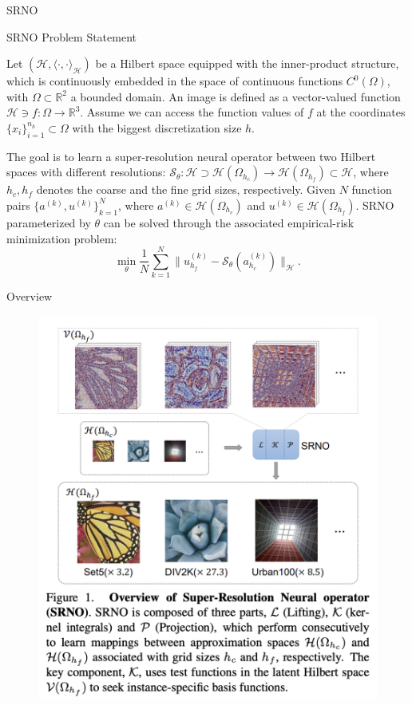 \documentclass{beamer}
\begin{document}
\begin{section}{SRNO}
    \begin{frame}{SRNO Problem Statement}
    \begin{block}{}
        Let $(\mathcal{H},\langle\cdot,\cdot\rangle_{\mathcal{H}})$ be a Hilbert space equipped with the inner-product structure, which is continuously embedded in the space of continuous functions $C^0(\Omega)$, with $\Omega \subset \mathbb{R}^2$ a bounded domain. An image is defined as a vector-valued function $\mathcal{H}\ni f:\Omega \rightarrow \mathbb{R}^3$. Assume we can access the function values of $f$ at the coordinates $\{x_i\}_{i=1}^{n_h} \subset \Omega$ with the biggest discretization size $h$.
    \end{block}

    \begin{block}{}
        The goal is to learn a super-resolution neural operator between two Hilbert spaces with different resolutions: $\mathcal{S}_{\theta}: \mathcal{H}\supset\mathcal{H}(\Omega_{h_c}) \rightarrow \mathcal{H}(\Omega_{h_f})\subset\mathcal{H}$, where $h_c,h_f$ denotes the coarse and the fine grid sizes, respectively. Given $N$ function pairs $\{a^{(k)},u^{(k)}\}_{k=1}^N$, where $a^{(k)}\in\mathcal{H}(\Omega_{h_c})$ and $u^{(k)}\in\mathcal{H}(\Omega_{h_f})$. SRNO parameterized by $\theta$ can be solved through the associated empirical-risk minimization problem:
        $$
        \min_{\theta}\frac{1}{N}\sum_{k=1}^N{\lVert u_{h_f}^{(k)}-\mathcal{S}_{\theta}(a_{h_c}^{(k)}) \rVert_{\mathcal{H}}.}
        $$
    \end{block}
    \end{frame}

    \begin{frame}{Overview}
    \begin{figure}[H]
        \centering
        \includegraphics[width=0.5\linewidth]{2.png}
        \label{fig:Overview of Super-Resolution Neural Operator}
    \end{figure}
        

\end{frame}
\end{section}
\end{document}
